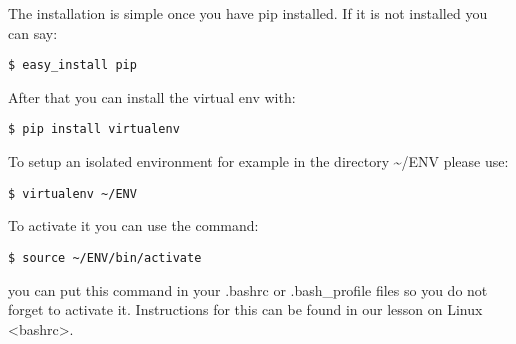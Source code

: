 The installation is simple once you have pip installed. If it is not
installed you can say:

\begin{verbatim}
$ easy_install pip
\end{verbatim}

After that you can install the virtual env with:

\begin{verbatim}
$ pip install virtualenv
\end{verbatim}

To setup an isolated environment for example in the directory
\textasciitilde{}/ENV please use:

\begin{verbatim}
$ virtualenv ~/ENV
\end{verbatim}

To activate it you can use the command:

\begin{verbatim}
$ source ~/ENV/bin/activate
\end{verbatim}

you can put this command in your .bashrc or .bash\_profile files so you
do not forget to activate it. Instructions for this can be
found in our lesson on Linux \textless{}bashrc\textgreater{}.
